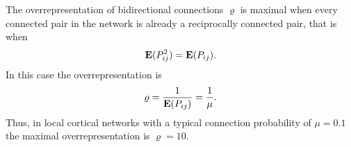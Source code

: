 
The overrepresentation of bidirectional connections $\varrho$ is maximal when every connected pair in the network is already a reciprocally connected pair, that is when
\begin{align}
\operatorname{\mathbf{E}}(P_{ij}^2) = \operatorname{\mathbf{E}}(P_{ij}).
\end{align}
%
In this case the overrepresentation is
\begin{align}
\varrho = \frac{1}{\operatorname{\mathbf{E}}(P_{ij})} = \frac{1}{\mu}.
\end{align}
Thus, in local cortical networks with a typical connection probability of $\mu = 0.1$ the maximal overrepresentation is $\varrho = 10$.
